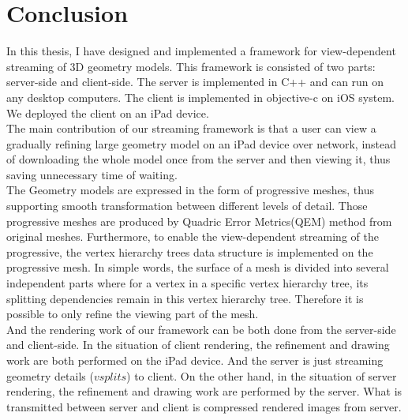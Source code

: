 \chapter{Conclusion}
\label{chapter:Conclusion}
In this thesis, I have designed and implemented a framework for view-dependent streaming of 3D geometry models. This framework is consisted of two parts: server-side and client-side. The server is implemented in C++ and can run on any desktop computers. The client is implemented in objective-c on iOS system. We deployed the client on an iPad device. \\

The main contribution of our streaming framework is that a user can view a gradually refining large geometry model on an iPad device over network, instead of downloading the whole model once from the server and then viewing it, thus saving unnecessary time of waiting. \\

The Geometry models are expressed in the form of progressive meshes, thus supporting smooth transformation between different levels of detail. Those progressive meshes are produced by Quadric Error Metrics(QEM) method from original meshes. Furthermore, to enable the view-dependent streaming of the progressive, the vertex hierarchy trees data structure is implemented on the progressive mesh. In simple words, the surface of a mesh is divided into several independent parts where for a vertex in a specific vertex hierarchy tree, its splitting dependencies remain in this vertex hierarchy tree. Therefore it is possible to only refine the viewing part of the mesh. \\

And the rendering work of our framework can be both done from the server-side and client-side. In the situation of client rendering, the refinement and drawing work are both performed on the iPad device. And the server is just streaming geometry details ($vsplits$) to client. On the other hand, in the situation of server rendering, the refinement and drawing work are performed by the server. What is transmitted between server and client is compressed rendered images from server. \\

